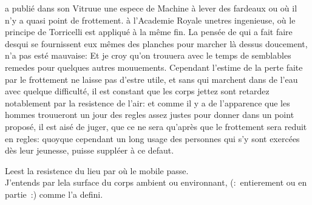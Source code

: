 a publi\'{e} dans son
Vitruue\protect{}
une espece de Machine \`{a} lever des fardeaux ou
o\`{u} il n'y a quasi point de frottement.
\`{a} l'Academie Royale unetres ingenieuse,
o\`{u} le principe de
Torricelli\protect{}
est appliqu\'{e} \`{a} la m\^{e}me fin.
La pens\'{e}e de 
qui a fait faire desqui se fournissent eux m\^{e}mes des planches pour marcher l\`{a} dessus doucement,
n'a pas est\'{e} mauvaise:
Et je croy qu'on trouuera avec le temps de semblables remedes pour quelques autres mouuements.
Cependant l'estime de la perte faite par le frottement ne laisse pas d'estre utile,
et sans 
qui marchent dans de l'eau avec quelque difficult\'{e},
il est constant que les corps jettez\protect{}
sont retardez notablement par la resistence de l'air\protect{}:
et comme il y a de l'apparence que les hommes trouueront un jour des regles assez justes pour
donner dans un point propos\'{e},
il est ais\'{e} de juger,
que ce ne sera qu'apr\`{e}s que le frottement sera reduit en regles:
quoyque cependant un long usage des personnes qui s'y sont exerc\'{e}es d\`{e}s leur jeunesse,
puisse suppl\'{e}er \`{a} ce defaut.
\pend
\vspace*{3mm}%
\begin{Geometrico}
Leest la resistence\protect{}
du lieu\protect{} par o\`{u} le mobile\protect{}
passe.\\%
J'entends par lela surface du corps ambient ou environnant,
(:~entierement ou en partie~:)
comme  l'a defini.
\end{Geometrico}
